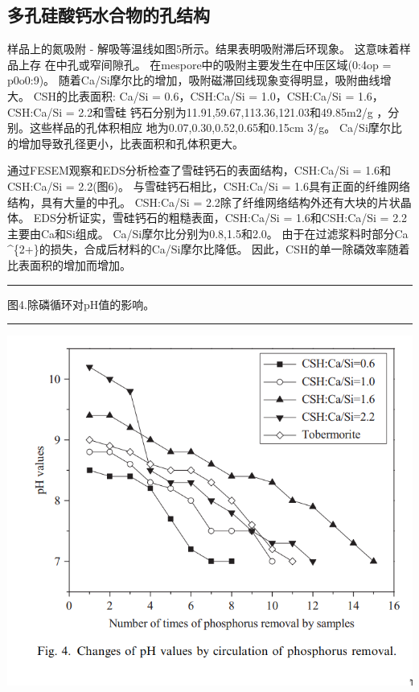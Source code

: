\documentclass[11pt]{article}
\begin{document}
\subsection{多孔硅酸钙水合物的孔结构}
\label{sec:org0af7cfa}
样品上的氮吸附 - 解吸等温线如图5所示。结果表明吸附滞后环现象。 这意味着样品上存
在中孔或窄间隙孔\cite{Poreestructure_and_surface_fractal_characteristics_of_calcium_silicate_hydrates_contained_organic_macromolecule}。 在mespore中的吸附主要发生在中压区域(0:4op = p0o0:9)。
随着Ca/Si摩尔比的增加，吸附磁滞回线现象变得明显，吸附曲线增大。 CSH的比表面积:
Ca/Si = 0.6，CSH:Ca/Si = 1.0，CSH:Ca/Si = 1.6，CSH:Ca/Si = 2.2和雪硅
钙石分别为11.91,59.67,113.36,121.03和49.85m2/g ，分别。这些样品的孔体积相应
地为0.07,0.30,0.52,0.65和0.15cm 3/g。 Ca/Si摩尔比的增加导致孔径更小，比表面积和孔体积更大。

通过FESEM观察和EDS分析检查了雪硅钙石的表面结构，CSH:Ca/Si = 1.6和CSH:Ca/Si = 2.2(图6)。 与雪硅钙石相比，CSH:Ca/Si = 1.6具有正面的纤维网络结构，具有大量的中孔。 CSH:Ca/Si = 2.2除了纤维网络结构外还有大块的片状晶体。 EDS分析证实，雪硅钙石的粗糙表面，CSH:Ca/Si = 1.6和CSH:Ca/Si = 2.2主要由Ca和Si组成。 Ca/Si摩尔比分别为0.8,1.5和2.0。 由于在过滤浆料时部分Ca \^{}\{2+\}的损失，合成后材料的Ca/Si摩尔比降低。 因此，CSH的单一除磷效率随着比表面积的增加而增加。

\noindent\rule{\textwidth}{0.5pt}

图4.除磷循环对pH值的影响。

\noindent\rule{\textwidth}{0.5pt}
\includegraphics[scale=0.5]{fig.4.png}
\end{document}

